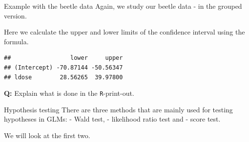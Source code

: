 \documentclass[
  ignorenonframetext,
]{beamer}
\newenvironment{Shaded}{\begin{snugshade}}{\end{snugshade}}
\newcommand{\AttributeTok}[1]{\textcolor[rgb]{0.13,0.29,0.53}{#1}}
\newcommand{\DecValTok}[1]{\textcolor[rgb]{0.00,0.00,0.81}{#1}}
\newcommand{\FloatTok}[1]{\textcolor[rgb]{0.00,0.00,0.81}{#1}}
\newcommand{\FunctionTok}[1]{\textcolor[rgb]{0.13,0.29,0.53}{\textbf{#1}}}
\newcommand{\NormalTok}[1]{#1}
\newcommand{\OtherTok}[1]{\textcolor[rgb]{0.56,0.35,0.01}{#1}}
\newcommand{\SpecialCharTok}[1]{\textcolor[rgb]{0.81,0.36,0.00}{\textbf{#1}}}
\newcommand{\StringTok}[1]{\textcolor[rgb]{0.31,0.60,0.02}{#1}}
\begin{document}
\begin{frame}[fragile]
\begin{block}{Example with the beetle data}
\protect\hypertarget{example-with-the-beetle-data}{}
Again, we study our beetle data - in the grouped version.

Here we calculate the upper and lower limits of the confidence interval
using the formula.

\begin{Shaded}
\end{Shaded}

\begin{verbatim}
##                 lower     upper
## (Intercept) -70.87144 -50.56347
## ldose        28.56265  39.97800
\end{verbatim}

\textbf{Q:} Explain what is done in the \texttt{R}-print-out.
\end{block}
\end{frame}

\begin{frame}
\begin{block}{Hypothesis testing}
\protect\hypertarget{hypothesis-testing}{}
There are three methods that are mainly used for testing hypotheses in
GLMs: - Wald test, - likelihood ratio test and - score test.

We will look at the first two.
\end{block}
\end{frame}
\end{document}
